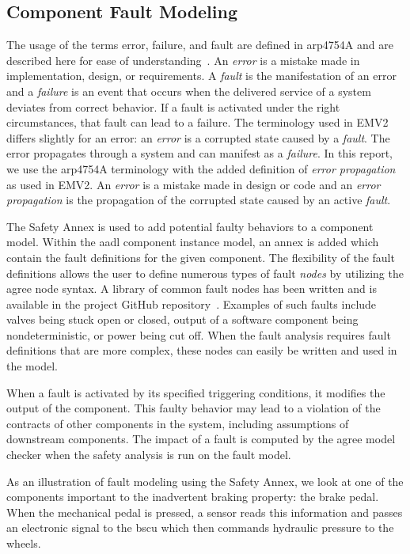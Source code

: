 \subsection{Component Fault Modeling}
\label{subsec:compFM}
The usage of the terms error, failure, and fault are defined in \gls{arp}4754A and are described here for ease of understanding~\cite{SAE:ARP4754A}. An \textit{error} is a mistake made in implementation, design, or requirements. A \textit{fault} is the manifestation of an error and a \textit{failure} is an event that occurs when the delivered service of a system deviates from correct behavior. If a fault is activated under the right circumstances, that fault can lead to a failure. The terminology used in EMV2 differs slightly for an error: an \textit{error} is a corrupted state caused by a \textit{fault}. The error propagates through a system and can  manifest as a \textit{failure}. In this report, we use the \gls{arp}4754A terminology with the added definition of \textit{error propagation} as used in EMV2. An \textit{error} is a mistake made in design or code and an \textit{error propagation} is the propagation of the corrupted state caused by an active \textit{fault}. 

The Safety Annex is used to add potential faulty behaviors to a component model. Within the \gls{aadl} component instance model, an annex is added which contain the fault definitions for the given component. The flexibility of the fault definitions allows the user to define numerous types of fault \textit{nodes} by utilizing the \gls{agree} node syntax. A library of common fault nodes has been written and is available in the project GitHub repository~\cite{SAGithub}. Examples of such faults include valves being stuck open or closed, output of a software component being nondeterministic, or power being cut off.  When the fault analysis requires fault definitions that are more complex, these nodes can easily be written and used in the model. 

When a fault is activated by its specified triggering conditions, it modifies the output of the component. This faulty behavior may lead to a violation of the contracts of other components in the system, including assumptions of downstream components. The impact of a fault is computed by the \gls{agree} model checker when the safety analysis is run on the fault model. 

As an illustration of fault modeling using the Safety Annex, we look at one of the components important to the inadvertent braking property: the brake pedal. When the mechanical pedal is pressed, a sensor reads this information and passes an electronic signal to the \gls{bscu} which then commands hydraulic pressure to the wheels. 

